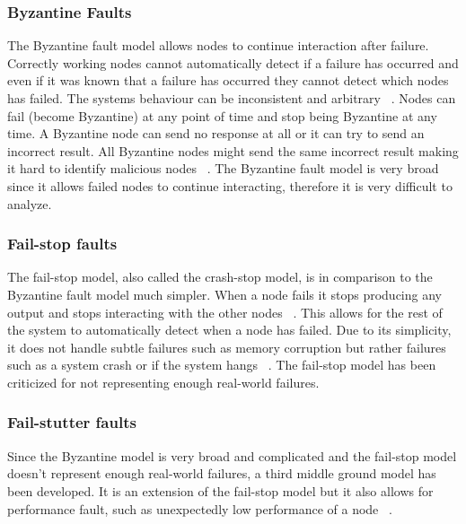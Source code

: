 \documentclass{cslthse-msc}
\begin{document}
\subsubsection{Byzantine Faults} \label{subsub:background_byzantine}
The Byzantine fault model allows nodes to continue interaction after failure. Correctly working nodes cannot automatically detect if a failure has occurred and even if it was known that a failure has occurred they cannot detect which nodes has failed. The systems behaviour can be inconsistent and arbitrary ~\cite{surveyFaultParallel}. Nodes can fail (become Byzantine) at any point of time and stop being Byzantine at any time. A Byzantine node can send no response at all or it can try to send an incorrect result. All Byzantine nodes might send the same incorrect result making it hard to identify malicious nodes ~\cite{selfAdaptRel}. %
The Byzantine fault model is very broad since it allows failed nodes to continue interacting, therefore it is very difficult to analyze.


\subsubsection{Fail-stop faults} \label{subsub:background_fail_stop}
The fail-stop model, also called the crash-stop model, is in comparison to the Byzantine fault model much simpler. When a node fails it stops producing any output and stops interacting with the other nodes ~\cite{faultTolerantFundamentals}. This allows for the rest of the system to automatically detect when a node has failed. Due to its simplicity, it does not handle subtle failures such as memory corruption but rather failures such as a system crash or if the system hangs ~\cite{surveyFaultParallel}. The fail-stop model has been criticized for not representing enough real-world failures.


\subsubsection{Fail-stutter faults}
Since the Byzantine model is very broad and complicated and the fail-stop model doesn't represent enough real-world failures, a third middle ground model has been developed. It is an extension of the fail-stop model but it also allows for performance fault, such as unexpectedly low performance of a node ~\cite{surveyFaultParallel}.
\end{document}
